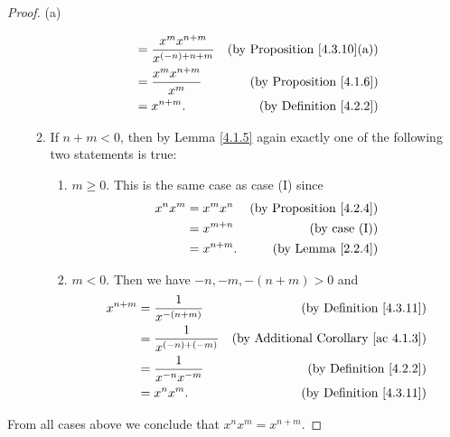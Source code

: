 \begin{proof}{(a)}
\begin{enumerate}[label=(\Roman*)]
\begin{enumerate}[label=(\roman*)]
\begin{align*}
                                    & = \frac{x^m x^{n + m}}{x^{(-n) + n + m}} & \text{(by Proposition \ref{4.3.10}(a))} \\
                                    & = \frac{x^m x^{n + m}}{x^m}              & \text{(by Proposition \ref{4.1.6})}     \\
                                    & = x^{n + m}.                             & \text{(by Definition \ref{4.2.2})}
                        \end{align*}
                  \item If \(n + m < 0\), then by Lemma \ref{4.1.5} again exactly one of the following two statements is true:
                        \begin{enumerate}[label=(\arabic*)]
                            \item \(m \geq 0\).
                                  This is the same case as case (I) since
                                  \begin{align*}
                                      x^n x^m & = x^m x^n    & \text{(by Proposition \ref{4.2.4})} \\
                                              & = x^{m + n}  & \text{(by case (I))}                \\
                                              & = x^{n + m}. & \text{(by Lemma \ref{2.2.4})}
                                  \end{align*}
                            \item \(m < 0\).
                                  Then we have \(-n, -m, -(n + m) > 0\) and
                                  \begin{align*}
                                      x^{n + m} & = \frac{1}{x^{-(n + m)}}    & \text{(by Definition \ref{4.3.11})}             \\
                                                & = \frac{1}{x^{(-n) + (-m)}} & \text{(by Additional Corollary \ref{ac 4.1.3})} \\
                                                & = \frac{1}{x^{-n} x^{-m}}   & \text{(by Definition \ref{4.2.2})}              \\
                                                & = x^n x^m.                  & \text{(by Definition \ref{4.3.11})}
                                  \end{align*}
                        \end{enumerate}
              \end{enumerate}
    \end{enumerate}
    From all cases above we conclude that \(x^n x^m = x^{n + m}\).


\end{proof}
